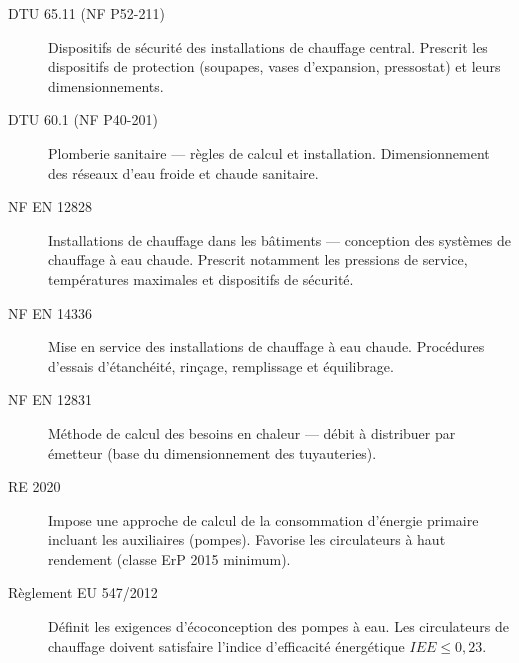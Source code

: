 \begin{description}
  \item[DTU 65.11 (NF P52-211)] Dispositifs de sécurité des installations de chauffage central. Prescrit les dispositifs de protection (soupapes, vases d'expansion, pressostat) et leurs dimensionnements.
  \item[DTU 60.1 (NF P40-201)] Plomberie sanitaire — règles de calcul et installation. Dimensionnement des réseaux d'eau froide et chaude sanitaire.
  \item[NF EN 12828] Installations de chauffage dans les bâtiments — conception des systèmes de chauffage à eau chaude. Prescrit notamment les pressions de service, températures maximales et dispositifs de sécurité.
  \item[NF EN 14336] Mise en service des installations de chauffage à eau chaude. Procédures d'essais d'étanchéité, rinçage, remplissage et équilibrage.
  \item[NF EN 12831] Méthode de calcul des besoins en chaleur — débit à distribuer par émetteur (base du dimensionnement des tuyauteries).
  \item[RE 2020] Impose une approche de calcul de la consommation d'énergie primaire incluant les auxiliaires (pompes). Favorise les circulateurs à haut rendement (classe ErP 2015 minimum).
  \item[Règlement EU 547/2012] Définit les exigences d'écoconception des pompes à eau. Les circulateurs de chauffage doivent satisfaire l'indice d'efficacité énergétique $IEE \leq 0{,}23$.
\end{description}

